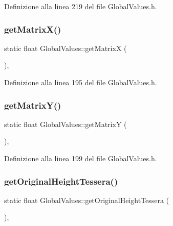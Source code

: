 Definizione alla linea 219 del file Global\+Values.\+h.

\mbox{\label{class_global_values_a1305db5c3c8dc85384f7792f9fa3665d}} 
\subsubsection{\texorpdfstring{get\+Matrix\+X()}{getMatrixX()}}
{\footnotesize\ttfamily static float Global\+Values\+::get\+MatrixX (\begin{DoxyParamCaption}{ }\end{DoxyParamCaption})\hspace{0.3cm}{\ttfamily [inline]}, {\ttfamily [static]}}



Definizione alla linea 195 del file Global\+Values.\+h.

\mbox{\label{class_global_values_abdf8c3dd80b6950cc82d0f2b2414bd81}} 
\subsubsection{\texorpdfstring{get\+Matrix\+Y()}{getMatrixY()}}
{\footnotesize\ttfamily static float Global\+Values\+::get\+MatrixY (\begin{DoxyParamCaption}{ }\end{DoxyParamCaption})\hspace{0.3cm}{\ttfamily [inline]}, {\ttfamily [static]}}



Definizione alla linea 199 del file Global\+Values.\+h.

\mbox{\label{class_global_values_a703b253eb6956a732cc64631f2dc5acc}} 
\subsubsection{\texorpdfstring{get\+Original\+Height\+Tessera()}{getOriginalHeightTessera()}}
{\footnotesize\ttfamily static float Global\+Values\+::get\+Original\+Height\+Tessera (\begin{DoxyParamCaption}{ }\end{DoxyParamCaption})\hspace{0.3cm}{\ttfamily [inline]}, {\ttfamily [static]}}



